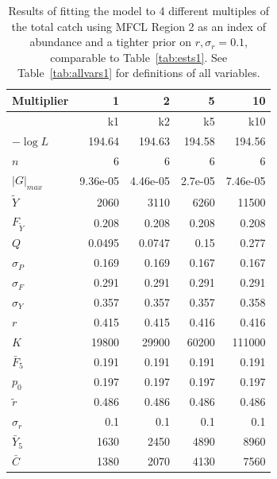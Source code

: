 \documentclass[12pt,letterpaper]{article}
\newcommand\MSY{\widetilde{Y}}
\newcommand\Fmsy{F_{\MSY}}
\begin{document}
\begin{table}
{\small
\caption{Results of fitting the model to 4 different multiples of the
total catch using MFCL Region 2 as an index of abundance and a tighter
prior on $r, \sigma_r = 0.1$, comparable to Table~\ref{tab:ests1}. 
See Table~\ref{tab:allvars1} for definitions of all variables.
\label{tab:k2-rprior}}
\begin{center}
\begin{tabular}{|l|rrrr|}
\hline
Multiplier  & 1 & 2 & 5 & 10\\
\hline
&k1 & k2 & k5 & k10\\
$-\log L$ & 194.64 & 194.63 & 194.58 & 194.56\\
$n$ & 6 & 6 & 6 & 6\\
$|G|_{max}$ & 9.36e-05 & 4.46e-05 & 2.7e-05 & 7.46e-05\\
\hline
$\MSY$ & 2060 & 3110 & 6260 & 11500\\
$\Fmsy$ & 0.208 & 0.208 & 0.208 & 0.208\\
$Q$ & 0.0495 & 0.0747 & 0.15 & 0.277\\
$\sigma_P$ & 0.169 & 0.169 & 0.167 & 0.167\\
$\sigma_F$ & 0.291 & 0.291 & 0.291 & 0.291\\
$\sigma_Y$ & 0.357 & 0.357 & 0.357 & 0.358\\
\hline
$r$ & 0.415 & 0.415 & 0.416 & 0.416\\
$K$ & 19800 & 29900 & 60200 & 111000\\
$\bar{F}_5$ & 0.191 & 0.191 & 0.191 & 0.191\\
\hline
$p_0$ & 0.197 & 0.197 & 0.197 & 0.197\\
$\tilde{r}$ & 0.486 & 0.486 & 0.486 & 0.486\\
$\sigma_r$ & 0.1 & 0.1 & 0.1 & 0.1\\
$\bar{Y}_5$ & 1630 & 2450 & 4890 & 8960\\
$\bar{C}$ & 1380 & 2070 & 4130 & 7560\\
\hline
\end{tabular}
\end{center}
}
\end{table}
\end{document}
